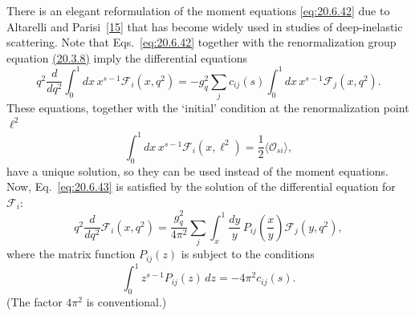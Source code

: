 There is an elegant reformulation of the moment equations \eqref{eq:20.6.42} due to Altarelli and Parisi~\hyperref[ch20-ref-15]{[15]} that has become widely used in studies of deep-inelastic scattering.
Note that Eqs.~\eqref{eq:20.6.42} together with the renormalization group equation \hyperref[eq:20.3.8]{(20.3.8)} imply the differential equations
\begin{equation}
q^2\frac{d}{dq^2}
\int_0^1dx\,x^{s-1}\mathcal F_i(x,q^2)
=-g_q^2\sum_jc_{ij}(s)
\int_0^1dx\,x^{s-1}\mathcal F_j(x,q^2).
\tag{20.6.43}\label{eq:20.6.43}
\end{equation}
These equations, together with the `initial' condition at the renormalization point $\ell^2$
\begin{equation}
\int_0^1dx\,x^{s-1}\mathcal F_i(x,\ell^2)
=\frac12\langle\mathcal O_{si}\rangle,
\tag{20.6.44}\label{eq:20.6.44}
\end{equation}
have a unique solution, so they can be used instead of the moment equations. Now, Eq.~\eqref{eq:20.6.43} is satisfied by the solution of the differential equation for $\mathcal F_i$:
\begin{equation}
q^2\frac{d}{dq^2}\mathcal F_i(x,q^2)
=\frac{g_q^2}{4\pi^2}
\sum_j\int_x^1\frac{dy}{y}\,
P_{ij}\left(\frac{x}{y}\right)
\mathcal F_j(y,q^2),
\tag{20.6.45}\label{eq:20.6.45}
\end{equation}
where the matrix function $P_{ij}(z)$ is subject to the conditions
\begin{equation}
\int_0^1z^{s-1}P_{ij}(z)\,dz
=-4\pi^2c_{ij}(s).
\tag{20.6.46}\label{eq:20.6.46}
\end{equation}
(The factor $4\pi^2$ is conventional.)

